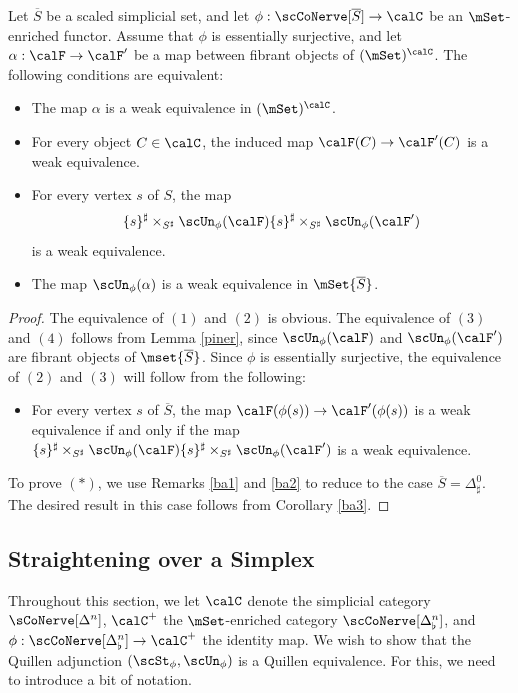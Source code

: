\begin{corollary}\label{ba4}
Let $\overline{S}$ be a scaled simplicial set, and let $\phi: \scCoNerve[\overline{S} ] \rightarrow \calC$ be an $\mSet$-enriched functor. Assume that $\phi$ is essentially surjective, and let
$\alpha: \calF \rightarrow \calF'$ be a map between fibrant objects of $(\mSet)^{\calC}$. The following conditions are equivalent:
\begin{itemize}
\item[$(1)$] The map $\alpha$ is a weak equivalence in $(\mSet)^{\calC}$.
\item[$(2)$] For every object $C \in \calC$, the induced map
$\calF(C) \rightarrow \calF'(C)$ is a weak equivalence.
\item[$(3)$] For every vertex $s$ of $S$, the map
$$ \{s\}^{\sharp} \times_{S^{\sharp} } \scUn_{\phi}(\calF)
\{s\}^{\sharp} \times_{ S^{\sharp} } \scUn_{\phi}(\calF')$$
is a weak equivalence.
\item[$(4)$] The map $\scUn_{\phi}(\alpha)$ is a weak equivalence in
$\mSet{\overline{S}}$.  
\end{itemize}
\end{corollary}

\begin{proof}
The equivalence of $(1)$ and $(2)$ is obvious. The equivalence of $(3)$ and
$(4)$ follows from Lemma \ref{piner}, since $\scUn_{\phi}(\calF)$ and
$\scUn_{\phi}(\calF')$ are fibrant objects of $\mset{\overline{S}}$. 
Since $\phi$ is essentially surjective, the equivalence of $(2)$ and $(3)$ will follow
from the following:
\begin{itemize}
\item[$(\ast)$] For every vertex $s$ of $\overline{S}$, the map
$\calF( \phi(s) ) \rightarrow \calF'( \phi(s) )$ is a weak equivalence if and only if the map
$ \{s\}^{\sharp} \times_{S^{\sharp} } \scUn_{\phi}(\calF)
\{s\}^{\sharp} \times_{ S^{\sharp} } \scUn_{\phi}(\calF')$ is a weak equivalence.
\end{itemize}
To prove $(\ast)$, we use Remarks \ref{ba1} and \ref{ba2} to reduce to the case
$\overline{S} = \Delta^0_{\sharp}$. The desired result in this case follows from Corollary \ref{ba3}.
\end{proof}

\subsection{Straightening over a Simplex}\label{bisec3.5}

Throughout this section, we let $\calC$ denote the simplicial category
$\sCoNerve[\Delta^n]$, $\calC^{+}$ the $\mSet$-enriched category $\scCoNerve[ \Delta^n_{\flat} ]$, and $\phi: \scCoNerve[ \Delta^n_{\flat} ] \rightarrow \calC^{+}$ the identity map. 
We wish to show that the Quillen adjunction
$(\scSt_{\phi}, \scUn_{\phi})$ is a Quillen equivalence. For this, we need to introduce a bit of notation.

